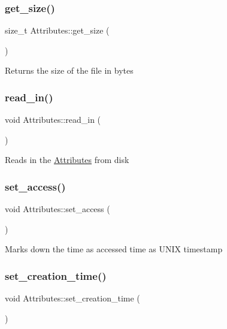 \subsubsection{\texorpdfstring{get\+\_\+size()}{get\_size()}}
{\footnotesize\ttfamily size\+\_\+t Attributes\+::get\+\_\+size (\begin{DoxyParamCaption}{ }\end{DoxyParamCaption})}

\begin{DoxyReturn}{Returns}
the size of the file in bytes 
\end{DoxyReturn}
\mbox{\label{classAttributes_ac33fbd6871ef707878690be92b9fc7ec}} 
\subsubsection{\texorpdfstring{read\+\_\+in()}{read\_in()}}
{\footnotesize\ttfamily void Attributes\+::read\+\_\+in (\begin{DoxyParamCaption}{ }\end{DoxyParamCaption})}

Reads in the \mbox{\hyperlink{classAttributes}{Attributes}} from disk \mbox{\label{classAttributes_af2ce6f6dce652a7adfeba3f28b4ee0bc}} 
\subsubsection{\texorpdfstring{set\+\_\+access()}{set\_access()}}
{\footnotesize\ttfamily void Attributes\+::set\+\_\+access (\begin{DoxyParamCaption}{ }\end{DoxyParamCaption})}

Marks down the time as accessed time as U\+N\+IX timestamp \mbox{\label{classAttributes_a4c518dae976d9186337f655f7b09cecc}} 
\subsubsection{\texorpdfstring{set\+\_\+creation\+\_\+time()}{set\_creation\_time()}}
{\footnotesize\ttfamily void Attributes\+::set\+\_\+creation\+\_\+time (\begin{DoxyParamCaption}{ }\end{DoxyParamCaption})}

